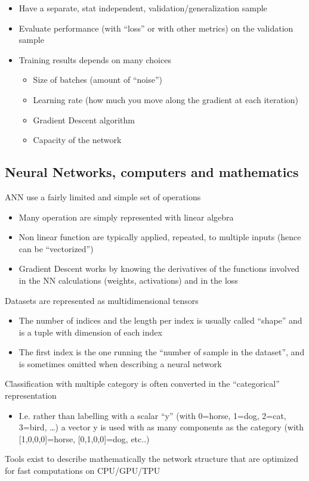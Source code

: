 \begin{itemize}
	\item Have a separate, stat independent, validation/generalization sample
	\item Evaluate performance (with “loss” or with other metrics) on the validation sample
	\item Training results depends on many choices
	\begin{itemize}
		\item Size of batches (amount of “noise”)
		\item Learning rate (how much you move along the gradient at
		each iteration)
		\item Gradient Descent algorithm
		\item Capacity of the network
	\end{itemize}
\end{itemize}

\subsection{Neural Networks, computers and mathematics}
ANN use a fairly limited and simple set of operations
\begin{itemize}
	\item Many operation are simply represented with linear algebra
	\item Non linear function are typically applied, repeated, to multiple inputs (hence can be “vectorized”)
	\item Gradient Descent works by knowing the derivatives of the functions involved in the NN calculations (weights, activations) and in the loss
\end{itemize}

Datasets are represented as multidimensional tensors

\begin{itemize}
	\item The number of indices and the length per index is usually called “shape” and is a tuple with dimension of each index
	\item The first index is the one running the “number of sample in the dataset”, and is sometimes omitted when describing a neural network
\end{itemize}

Classification with multiple category is often converted in the “categorical” representation
\begin{itemize}
	\item I.e. rather than labelling with a scalar “y” (with 0=horse, 1=dog, 2=cat, 3=bird, …) a vector y is used with as many components as the category (with [1,0,0,0]=horse, [0,1,0,0]=dog, etc..)
\end{itemize}
Tools exist to describe mathematically the network structure that are optimized for fast computations on CPU/GPU/TPU
